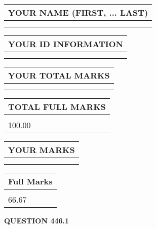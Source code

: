 \documentclass{ctexart}
\begin{document}
   
   
   
\newpage 
\setcounter{page}{ 
   446001 } 
   
   
   
   
\noindent\begin{tabular}{|l|}
\hline
YOUR NAME (FIRST, ... LAST)  \\
\hline
 \\ 
 \\ 
\hline
\end{tabular}
\hspace{0.05in} \begin{tabular}{|l|}
\hline
 YOUR   ID   INFORMATION  \\
\hline
 \\ 
 \\ 
\hline
\end{tabular}
   
   
\vspace{0.2in}\noindent\begin{tabular}{|l|}
\hline
YOUR TOTAL MARKS  \\
\hline
 \\ 
 \\ 
\hline
\end{tabular}
\hspace{0.05in} \begin{tabular}{|l|}
\hline
TOTAL FULL MARKS  \\
\hline
 \\ 
100.00 \\
\hline
\end{tabular}
   
   
 \vspace{0.2in}
 
 
 
 
   
   
  
\vspace{0.2in}
  
\noindent\begin{tabular}{|l|}
\hline
 YOUR MARKS  \\
\hline
 \\ 
 \\ 
\hline
\end{tabular}
\hspace{0.05in} \begin{tabular}{|l|}
\hline
 Full Marks  \\
\hline
 \\ 
66.67 \\
\hline
\end{tabular}
{\textbf{\Large{QUESTION
446.1 
}}}
  
\end{document}
